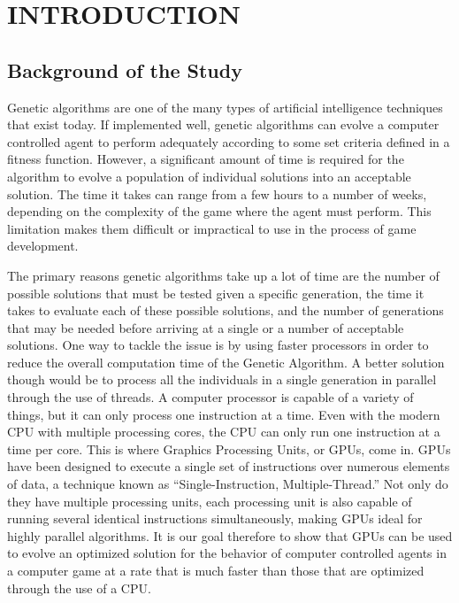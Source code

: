 \chapter{INTRODUCTION}

\section{Background of the Study}

Genetic algorithms are one of the many types of artificial intelligence
techniques that exist today. If implemented well, genetic algorithms can
evolve a computer controlled agent to perform adequately according to some
set criteria defined in a fitness function. However, a significant amount of 
time is required for the algorithm to evolve a population of individual solutions 
into an acceptable solution\cite{Schwab04}. The time it takes can range from
a few hours to a number of weeks, depending on the complexity of the game where
the agent must perform. This limitation makes them difficult or impractical to
use in the process of game development\cite{Schwab04}.

The primary reasons genetic algorithms take up a lot of time are the number of 
possible solutions that must be tested given a specific generation, the time it 
takes to evaluate each of these possible solutions, and the number of generations 
that may be needed before arriving at a single or a number of acceptable solutions\cite{Schwab04}. 
One way to tackle the issue is by using faster processors in order to reduce the
overall computation time of the Genetic Algorithm. A better solution though would
be to process all the individuals in a single generation in parallel through the
use of threads. A computer processor is capable of a variety of things, but it can only process
one instruction at a time.  Even with the modern CPU with multiple processing cores, the CPU can only
run one instruction at a time per core.  This is where Graphics Processing Units, or GPUs, come in.
GPUs have been designed to execute a single set of instructions over numerous elements
of data, a technique known as ``Single-Instruction, Multiple-Thread\cite{pdf:NVCudaPrgGuide}.''
Not only do they have multiple processing units, each processing unit is also
capable of running several identical instructions simultaneously, making GPUs ideal
for highly parallel algorithms\cite{pdf:NVCudaPrgGuide}. It is our goal therefore to
show that GPUs can be used to evolve an optimized solution for the behavior of computer
controlled agents in a computer game at a rate that is much faster than those that are optimized
through the use of a CPU.

